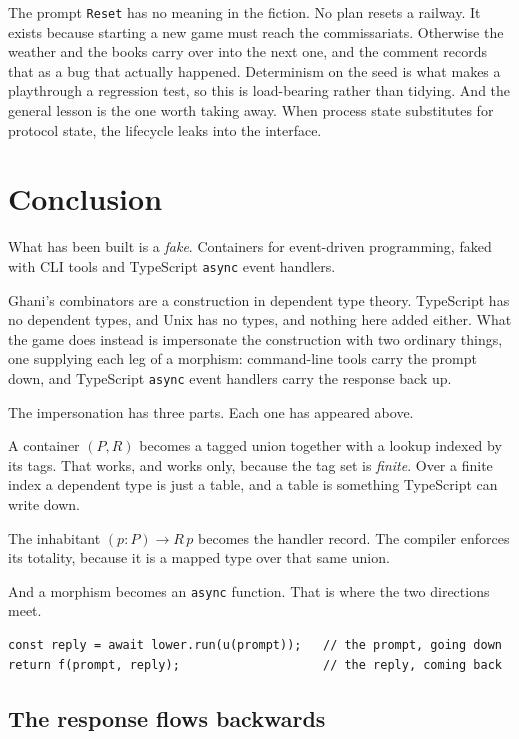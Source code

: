 \documentclass[11pt,a4paper]{article}
\begin{document}
The prompt \texttt{Reset} has no meaning in the fiction. No plan resets a railway. It exists because starting
a new game must reach the commissariats. Otherwise the weather and the books carry over into the
next one, and the comment records that as a bug that actually happened. Determinism on the seed is
what makes a playthrough a regression test, so this is load-bearing rather than tidying. And the
general lesson is the one worth taking away. When process state substitutes for protocol state, the
lifecycle leaks into the interface.

\section*{Conclusion}

What has been built is a \emph{fake}. Containers for event-driven programming, faked with CLI
tools and TypeScript \texttt{async} event handlers.

Ghani's combinators are a construction in dependent type theory. TypeScript has no dependent
types, and Unix has no types, and nothing here added either. What the game does instead is
impersonate the construction with two ordinary things, one supplying each leg of a morphism:
command-line tools carry the prompt down, and TypeScript \texttt{async} event handlers carry the
response back up.

The impersonation has three parts. Each one has appeared above.

A container $(P, R)$ becomes a tagged union together with a lookup indexed by its tags. That works,
and works only, because the tag set is \emph{finite}. Over a finite index a dependent type is just
a table, and a table is something TypeScript can write down.

The inhabitant $(p : P) \to R\,p$ becomes the handler record. The compiler enforces its totality,
because it is a mapped type over that same union.

And a morphism becomes an \texttt{async} function. That is where the two directions meet.

\begin{lstlisting}[language=TS]
const reply = await lower.run(u(prompt));   // the prompt, going down
return f(prompt, reply);                    // the reply, coming back
\end{lstlisting}

\subsection{The response flows backwards}
\end{document}
